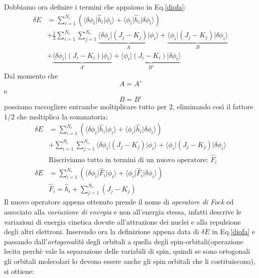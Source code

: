 \documentclass[oneside]{amsbook}
\numberwithin{section}{chapter}
\numberwithin{equation}{section}
\numberwithin{figure}{section}
\begin{document}
Dobbiamo ora definire i termini che appaiono in Eq.\ref{diofa}:
\begin{equation}
\begin{aligned}
\delta E &= \sum \limits_{i=1} ^{N_e}( \langle\delta \phi_i\vert \hat{h}_{i}\vert\phi_i\rangle +\langle\phi_i\vert\hat{h}_i\vert\delta\phi_i\rangle ) \\ &+ \frac{1}{2} \sum \limits_{i=1} ^{N_e} \sum \limits_{j=1} ^{N_e} \underbrace{\langle\delta\phi_i\vert(J_{j}-K_{j})\vert\phi_i\rangle}_A   + \underbrace{\langle\phi_i\vert(J_{j}-K_{j})\vert\delta\phi_i\rangle}_B \\
&+\underbrace{\langle\delta\phi_i\vert(J_{i}-K_{i})\vert\phi_i\rangle}_{A'} + \underbrace{\langle\phi_i\vert(J_{i}-K_{i})\vert\delta\phi_i\rangle}_{B'}
\end{aligned}
\end{equation}
Dal momento che $$ A=A' $$ e $$B = B'$$ possiamo raccogliere entrambe moltiplicare tutto per $2$, eliminando così il fattore $1/2$ che moltiplica la sommatoria:
\begin{equation}
\begin{aligned}
\delta E &= \sum \limits_{i=1} ^{N_e}( \langle\delta \phi_i\vert \hat{h}_{i}\vert\phi_i\rangle +\langle\phi_i\vert\hat{h}_i\vert\delta\phi_i\rangle ) \\ &+ \sum \limits_{i=1} ^{N_e} \sum \limits_{j=1} ^{N_e} \langle\delta\phi_i\vert(J_{j}-K_{j})\vert\phi_i\rangle   + \langle\phi_i\vert(J_{j}-K_{j})\vert\delta\phi_i\rangle \\
&\text{Riscriviamo tutto in termini di un nuovo operatore: } \hat{F}_i \\
\delta E &=\sum \limits_{i=1} ^{N_e}( \langle\delta \phi_i\vert \hat{F}_i\vert\phi_i\rangle +\langle\phi_i\vert\hat{F}_i\vert\delta\phi_i\rangle ) \\
&\hat{F}_i=\hat{h}_i+ \sum \limits_{j=1} ^{N_e}(J_{j}-K_{j})
\end{aligned}
\end{equation}
Il nuovo operatore appena ottenuto prende il nome di  \emph{operatore di Fock}  ed associato alla \emph{variazione di energia} e non all'energia stessa, infatti descrive le variazioni di energia cinetica dovute all'attrazione dei nuclei  e alla repulsione degli altri elettroni.
Inserendo ora la definizione appena data di $\delta E$ in Eq.\ref{diofa} e passando dall'\emph{ortogonalità} degli orbitali a quella degli spin-orbitali(operazione lecita perchè vale la separazione delle variabili di spin, quindi se sono ortogonali gli orbitali molecolari lo devono essere anche gli spin orbitali che li costituiscono), si ottiene:
\end{document}
